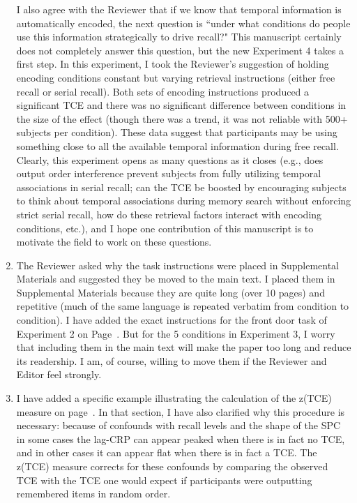 \documentclass[12pt]{article}
\begin{document}
\begin{enumerate}
	I also agree with the Reviewer that if we know that temporal information is automatically encoded, the next question is ``under what conditions do people use this information strategically to drive recall?" This manuscript certainly does not completely answer this question, but the new Experiment 4 takes a first step. In this experiment, I took the Reviewer's suggestion of holding encoding conditions constant but varying retrieval instructions (either free recall or serial recall). Both sets of encoding instructions produced a significant TCE and there was no significant difference between conditions in the size of the effect (though there was a trend, it was not reliable with 500+ subjects per condition). These data suggest that participants may be using something close to all the available temporal information during free recall. Clearly, this experiment opens as many questions as it closes (e.g., does output order interference prevent subjects from fully utilizing temporal associations in serial recall; can the TCE be boosted by encouraging subjects to think about temporal associations during memory search without enforcing strict serial recall, how do these retrieval factors interact with encoding conditions, etc.), and I hope one contribution of this manuscript is to motivate the field to work on these questions.


	\item
	The Reviewer asked why the task instructions were placed in Supplemental Materials and suggested they be moved to the main text. I placed them in Supplemental Materials because they are quite long (over 10 pages) and repetitive (much of the same language is repeated verbatim from condition to condition). I have added the exact instructions for the front door task of Experiment 2 on Page~\pageref{newinst}. But for the 5 conditions in Experiment 3, I worry that including them in the main text will make the paper too long and reduce its readership. I am, of course, willing to move them if the Reviewer and Editor feel strongly.

	\item
	I have added a specific example illustrating the calculation of the z(TCE) measure on page~\pageref{TCEex}. In that section, I have also clarified why this procedure is necessary: because of confounds with recall levels and the shape of the SPC in some cases the lag-CRP can appear peaked when there is in fact no TCE, and in other cases it can appear flat when there is in fact a TCE. The z(TCE) measure corrects for these confounds by comparing the observed TCE with the TCE one would expect if participants were outputting remembered items in random order.


\end{enumerate}
\end{document}
